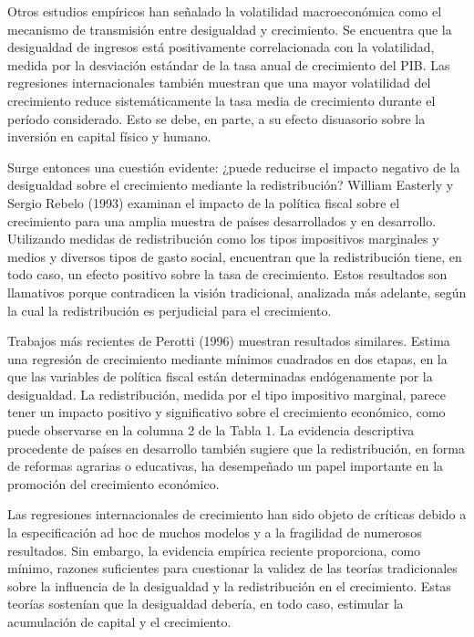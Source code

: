 \documentclass[10pt,a4paper]{article}
\begin{document}
Otros estudios empíricos han señalado la volatilidad macroeconómica como el mecanismo de transmisión entre desigualdad y crecimiento. Se encuentra que la desigualdad de ingresos está positivamente correlacionada con la volatilidad, medida por la desviación estándar de la tasa anual de crecimiento del PIB. Las regresiones internacionales también muestran que una mayor volatilidad del crecimiento reduce sistemáticamente la tasa media de crecimiento durante el período considerado. Esto se debe, en parte, a su efecto disuasorio sobre la inversión en capital físico y humano.

Surge entonces una cuestión evidente: ¿puede reducirse el impacto negativo de la desigualdad sobre el crecimiento mediante la redistribución? William Easterly y Sergio Rebelo (1993) examinan el impacto de la política fiscal sobre el crecimiento para una amplia muestra de países desarrollados y en desarrollo. Utilizando medidas de redistribución como los tipos impositivos marginales y medios y diversos tipos de gasto social, encuentran que la redistribución tiene, en todo caso, un efecto positivo sobre la tasa de crecimiento. Estos resultados son llamativos porque contradicen la visión tradicional, analizada más adelante, según la cual la redistribución es perjudicial para el crecimiento.

Trabajos más recientes de Perotti (1996) muestran resultados similares. Estima una regresión de crecimiento mediante mínimos cuadrados en dos etapas, en la que las variables de política fiscal están determinadas endógenamente por la desigualdad. La redistribución, medida por el tipo impositivo marginal, parece tener un impacto positivo y significativo sobre el crecimiento económico, como puede observarse en la columna 2 de la Tabla 1. La evidencia descriptiva procedente de países en desarrollo también sugiere que la redistribución, en forma de reformas agrarias o educativas, ha desempeñado un papel importante en la promoción del crecimiento económico.

Las regresiones internacionales de crecimiento han sido objeto de críticas debido a la especificación ad hoc de muchos modelos y a la fragilidad de numerosos resultados. Sin embargo, la evidencia empírica reciente proporciona, como mínimo, razones suficientes para cuestionar la validez de las teorías tradicionales sobre la influencia de la desigualdad y la redistribución en el crecimiento. Estas teorías sostenían que la desigualdad debería, en todo caso, estimular la acumulación de capital y el crecimiento.
\end{document}
